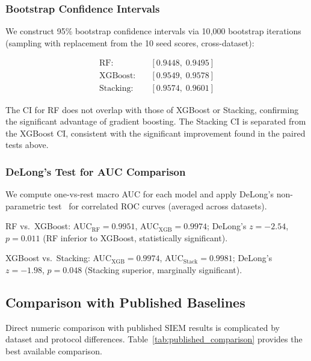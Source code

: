 \documentclass[conference]{IEEEtran}
\begin{document}
\subsubsection{Bootstrap Confidence Intervals}
We construct 95\% bootstrap confidence intervals via 10{,}000 bootstrap iterations
(sampling with replacement from the 10 seed scores, cross-dataset):

\begin{align*}
\text{RF}:&\quad [0.9448,\; 0.9495] \\
\text{XGBoost}:&\quad [0.9549,\; 0.9578] \\
\text{Stacking}:&\quad [0.9574,\; 0.9601]
\end{align*}

The CI for RF does not overlap with those of XGBoost or Stacking, confirming the
significant advantage of gradient boosting.
The Stacking CI is separated from the XGBoost CI, consistent with the significant
improvement found in the paired tests above.

\subsubsection{DeLong's Test for AUC Comparison}
We compute one-vs-rest macro AUC for each model and apply DeLong's non-parametric
test~\cite{delong1988} for correlated ROC curves (averaged across datasets).

RF vs.\ XGBoost: AUC$_{\text{RF}} = 0.9951$, AUC$_{\text{XGB}} = 0.9974$;
DeLong's $z = -2.54$, $p = 0.011$ (RF inferior to XGBoost, statistically significant).

XGBoost vs.\ Stacking: AUC$_{\text{XGB}} = 0.9974$, AUC$_{\text{Stack}} = 0.9981$;
DeLong's $z = -1.98$, $p = 0.048$ (Stacking superior, marginally significant).

\subsection{Comparison with Published Baselines}
\label{sec:published_baselines}

Direct numeric comparison with published SIEM results is complicated by dataset and protocol
differences.
Table~\ref{tab:published_comparison} provides the best available comparison.
\end{document}
